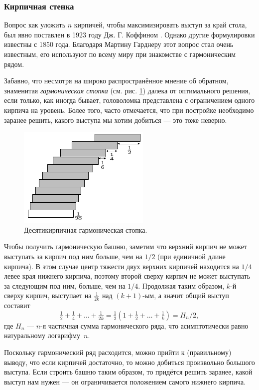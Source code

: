 \subsubsection*{Кирпичная стенка}

Вопрос как уложить $n$ кирпичей, чтобы максимизировать выступ за край стола, был явно поставлен в 1923 году Дж. Г. Коффином \cite{12}.
Однако другие формулировки известны с 1850 года.
Благодаря Мартину Гарднеру этот вопрос стал очень известным, его используют по всему миру при знакомстве с гармоническим рядом.

Забавно, что несмотря на широко распространённое мнение об обратном, знаменитая \emph{гармоническая стопка} (см. рис. \ref{pic:kirpich1}) далека от оптимального решения, если только, как иногда бывает, головоломка представлена с ограничением одного кирпича на уровень.
Более того, часто отмечается, что при постройке необходимо заранее решить, 
какого выступа мы хотим добиться --- это тоже неверно.

\begin{figure}[ht!]
\centering
\includegraphics[scale=1]{pics/kirpich1}
\caption{Десятикирпичная гармоническая стопка.}
\label{pic:kirpich1}
\end{figure}

Чтобы получить гармоническую башню, заметим что верхний кирпич не может выступать за  кирпич под ним больше, чем на $1/2$ (при единичной длине кирпича).
В этом случае центр тяжести двух верхних кирпичей находится на $1/4$ левее края нижнего кирпича, поэтому второй сверху кирпич не может выступать за следующим под ним, больше, чем на $1/4$.
Продолжая таким образом, $k$-й сверху кирпич, выступает на $\tfrac1{2k}$ над $(k + 1)$-ым, а значит общий выступ составит 
\[\tfrac12+\tfrac14+\dots+\tfrac1{2k}=\tfrac12(1+\tfrac12+\dots+\tfrac1k)=H_n/2,\]
где $H_n$ --- $n$-я частичная сумма гармонического ряда, что асимптотически равно натуральному логарифму~$n$.

Поскольку гармонический ряд расходится, можно прийти к (правильному) выводу, что если кирпичей достаточно, то можно добиться произвольно большого выступа.
Если строить башню таким образом, то придётся решить заранее, какой выступ нам нужен --- он ограничивается положением самого нижнего кирпича.

